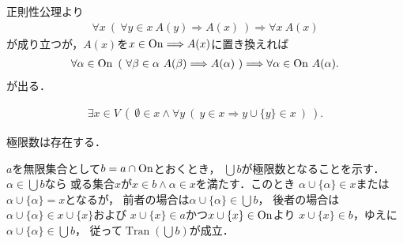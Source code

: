 	\begin{prf}
		正則性公理より
		\begin{align}
			\forall x\ \left(\ \forall y \in x\ A(y)
			\Longrightarrow A(x)\ \right)
			\Longrightarrow \forall x\ A(x)
		\end{align}
		が成り立つが，$A(x)$を$x \in \mathrm{On} \Longrightarrow A(x)$に置き換えれば
		\begin{align}
			\forall \alpha \in \ON\ 
			\left(\ \forall \beta \in \alpha\ A(\beta)
			\Longrightarrow A(\alpha)\ \right)
			\Longrightarrow \forall \alpha \in \ON\ A(\alpha).
		\end{align}
		が出る．
		\QED
	\end{prf}
	
	\begin{screen}
		\begin{axm}[無限公理]
			\begin{align}
				\exists x \in V\ (\ \emptyset \in x \wedge \forall y\ (\ y \in x
				\Longrightarrow y \cup \{y\} \in x\ )\ ).
			\end{align}
		\end{axm}
	\end{screen}
	
	\begin{screen}
		\begin{thm}[極限数の存在定理]
			極限数は存在する．
		\end{thm}
	\end{screen}
	
	\begin{prf}
		$a$を無限集合として$b = a \cap \mathrm{On}$とおくとき，
		$\bigcup b$が極限数となることを示す．
		$\alpha \in \bigcup b$なら
		或る集合$x$が$x \in b \wedge \alpha \in x$を満たす．このとき
		$\alpha \cup \{\alpha\} \in x$または$\alpha \cup \{\alpha\} = x$となるが，
		前者の場合は$\alpha \cup \{\alpha\} \in \bigcup b$，
		後者の場合は$\alpha \cup \{\alpha\} \in x \cup \{x\}$および
		$x \cup \{x\} \in a$かつ$x \cup \{x\} \in \mathrm{On}$より
		$x \cup \{x\} \in b$，ゆえに$\alpha \cup \{\alpha\} \in \bigcup b$，
		従って$\operatorname*{Tran}(\bigcup b)$が成立．
	\end{prf}
	
	
